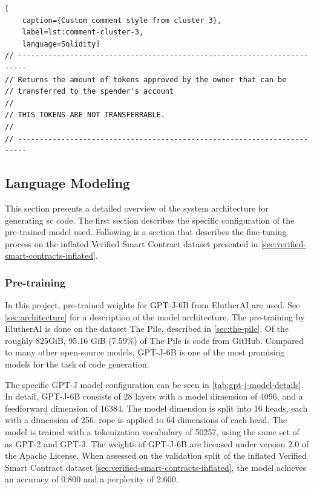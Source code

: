 \begin{lstlisting}[
    caption={Custom comment style from cluster 3},
    label=lst:comment-cluster-3,
    language=Solidity]
// ------------------------------------------------------------------------
// Returns the amount of tokens approved by the owner that can be
// transferred to the spender's account
//
// THIS TOKENS ARE NOT TRANSFERRABLE.
//
// ------------------------------------------------------------------------
\end{lstlisting}

\clearpage %

\subsection{Language Modeling}
\label{sec:rq1-language-modeling}
This section presents a detailed overview of the system architecture for generating \acrlong{sc} code. The first section describes the specific configuration of the pre-trained model used. Following is a section that describes the fine-tuning process on the inflated Verified Smart Contract dataset presented in \cref{sec:verified-smart-contracts-inflated}. 


\subsubsection{Pre-training}
\label{sec:pretraining}
In this project, pre-trained weights for GPT-J-6B from ElutherAI are used. See \cref{sec:architecture} for a description of the model  architecture. The pre-training by ElutherAI is done on the dataset The Pile, described in \cref{sec:the-pile}. Of the roughly 825GiB, 95.16 GiB (7.59\%) of The Pile is code from GitHub. Compared to many other open-source models, GPT-J-6B is one of the most promising models for the task of code generation.

The specific GPT-J model configuration can be seen in \cref{tab:gpt-j-model-details}. In detail, GPT-J-6B consists of 28 layers with a model dimension of 4096, and a feedforward dimension of 16384. The model dimension is split into 16 heads, each with a dimension of 256. \acrfull{rope} is applied to 64 dimensions of each head. The model is trained with a tokenization vocabulary of 50257, using the same set of  as GPT-2 and GPT-3. The weights of GPT-J-6B are licensed under version 2.0 of the Apache License. When assessed on the validation split of the inflated Verified Smart Contract dataset \cref{sec:verified-smart-contracts-inflated}, the model achieves an accuracy of 0.800 and a perplexity of 2.600.

